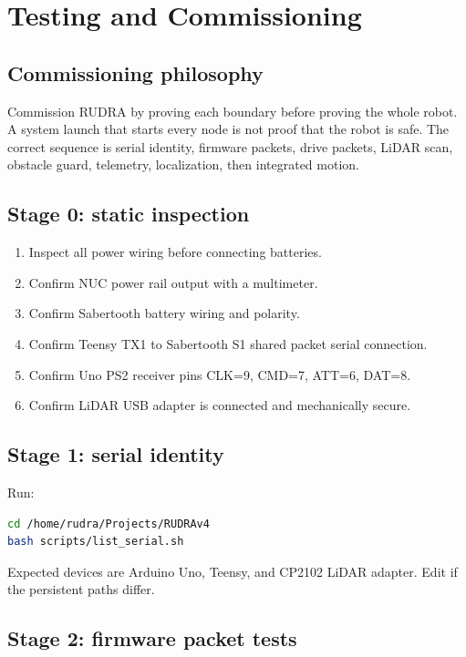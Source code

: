 \chapter{Testing and Commissioning}

\section{Commissioning philosophy}

Commission RUDRA by proving each boundary before proving the whole robot. A system launch that starts every node is not proof that the robot is safe. The correct sequence is serial identity, firmware packets, drive packets, LiDAR scan, obstacle guard, telemetry, localization, then integrated motion.

\section{Stage 0: static inspection}

\begin{enumerate}
  \item Inspect all power wiring before connecting batteries.
  \item Confirm NUC power rail output with a multimeter.
  \item Confirm Sabertooth battery wiring and polarity.
  \item Confirm Teensy TX1 to Sabertooth S1 shared packet serial connection.
  \item Confirm Uno PS2 receiver pins CLK=9, CMD=7, ATT=6, DAT=8.
  \item Confirm LiDAR USB adapter is connected and mechanically secure.
\end{enumerate}

\section{Stage 1: serial identity}

Run:

\begin{lstlisting}[language=bash]
cd /home/rudra/Projects/RUDRAv4
bash scripts/list_serial.sh
\end{lstlisting}

Expected devices are Arduino Uno, Teensy, and CP2102 LiDAR adapter. Edit  if the persistent paths differ.

\section{Stage 2: firmware packet tests}

